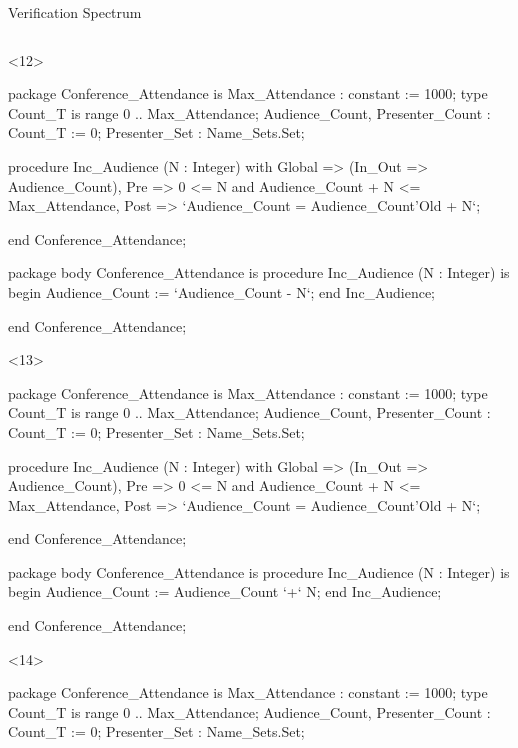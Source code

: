 \documentclass{beamer}
\begin{document}
\begin{frame}[fragile]{Verification Spectrum}
\begin{columns}
\begin{column}{9cm}
      \begin{onlyenv}<12>
      \begin{pxcode}[language=SPARK,style=magic,gobble=8]
        package Conference_Attendance
        is
           Max_Attendance : constant := 1000;
           type Count_T is range 0 .. Max_Attendance;
           Audience_Count, Presenter_Count : Count_T := 0;
           Presenter_Set : Name_Sets.Set;

           procedure Inc_Audience (N : Integer)
           with Global => (In_Out => Audience_Count),
                Pre    => 0 <= N and Audience_Count + N <= Max_Attendance,
                Post   => `Audience_Count = Audience_Count'Old + N`;

        end Conference_Attendance;

        package body Conference_Attendance
        is
           procedure Inc_Audience (N : Integer)
           is
           begin
              Audience_Count := `Audience_Count - N`;
           end Inc_Audience;

        end Conference_Attendance;
      \end{pxcode}
      \end{onlyenv}

      \begin{onlyenv}<13>
      \begin{pxcode}[language=SPARK,style=magic,gobble=8]
        package Conference_Attendance
        is
           Max_Attendance : constant := 1000;
           type Count_T is range 0 .. Max_Attendance;
           Audience_Count, Presenter_Count : Count_T := 0;
           Presenter_Set : Name_Sets.Set;

           procedure Inc_Audience (N : Integer)
           with Global => (In_Out => Audience_Count),
                Pre    => 0 <= N and Audience_Count + N <= Max_Attendance,
                Post   => `Audience_Count = Audience_Count'Old + N`;

        end Conference_Attendance;

        package body Conference_Attendance
        is
           procedure Inc_Audience (N : Integer)
           is
           begin
              Audience_Count := Audience_Count `+` N;
           end Inc_Audience;

        end Conference_Attendance;
      \end{pxcode}
      \end{onlyenv}

      \begin{onlyenv}<14>
      \begin{pxcode}[language=SPARK,style=magic,gobble=8]
        package Conference_Attendance
        is
           Max_Attendance : constant := 1000;
           type Count_T is range 0 .. Max_Attendance;
           Audience_Count, Presenter_Count : Count_T := 0;
           Presenter_Set : Name_Sets.Set;


\end{pxcode}
\end{onlyenv}
\end{column}
\end{columns}
\end{frame}
\end{document}

